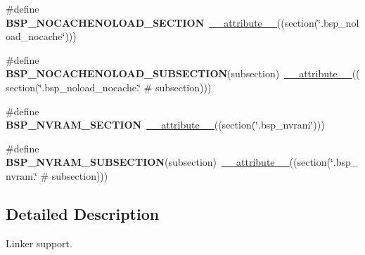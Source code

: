 \begin{DoxyCompactItemize}
\#define {\bfseries B\+S\+P\+\_\+\+N\+O\+C\+A\+C\+H\+E\+N\+O\+L\+O\+A\+D\+\_\+\+S\+E\+C\+T\+I\+ON}~\mbox{\hyperlink{struct____attribute____}{\+\_\+\+\_\+attribute\+\_\+\+\_\+}}((section(\char`\"{}.bsp\+\_\+noload\+\_\+nocache\char`\"{})))
\item 
\mbox{\label{group__RTEMSBSPsPowerPCSharedLinker_gae12ac7f431e92a71e8e86af80e873150}} 
\#define {\bfseries B\+S\+P\+\_\+\+N\+O\+C\+A\+C\+H\+E\+N\+O\+L\+O\+A\+D\+\_\+\+S\+U\+B\+S\+E\+C\+T\+I\+ON}(subsection)~\mbox{\hyperlink{struct____attribute____}{\+\_\+\+\_\+attribute\+\_\+\+\_\+}}((section(\char`\"{}.bsp\+\_\+noload\+\_\+nocache.\char`\"{} \# subsection)))
\item 
\mbox{\label{group__RTEMSBSPsPowerPCSharedLinker_ga9fd3eb090e51633042423f873eb48818}} 
\#define {\bfseries B\+S\+P\+\_\+\+N\+V\+R\+A\+M\+\_\+\+S\+E\+C\+T\+I\+ON}~\mbox{\hyperlink{struct____attribute____}{\+\_\+\+\_\+attribute\+\_\+\+\_\+}}((section(\char`\"{}.bsp\+\_\+nvram\char`\"{})))
\item 
\mbox{\label{group__RTEMSBSPsPowerPCSharedLinker_ga87a26386618e5aa76978e09bbc88778c}} 
\#define {\bfseries B\+S\+P\+\_\+\+N\+V\+R\+A\+M\+\_\+\+S\+U\+B\+S\+E\+C\+T\+I\+ON}(subsection)~\mbox{\hyperlink{struct____attribute____}{\+\_\+\+\_\+attribute\+\_\+\+\_\+}}((section(\char`\"{}.bsp\+\_\+nvram.\char`\"{} \# subsection)))
\end{DoxyCompactItemize}


\subsection{Detailed Description}
Linker support. 

